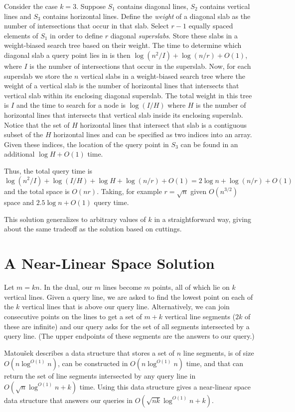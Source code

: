 \documentclass{article}
\newcommand{\polylog}{\log^{O(1)}}
\begin{document}
Consider the case $k=3$.  Suppose $S_1$ contains diagonal lines, $S_2$
contains vertical lines and $S_3$ contains horizontal lines. Define
the \emph{weight} of a diagonal slab as the number of intersections
that occur in that slab.  Select $r-1$ equally spaced elements of
$S_1$ in order to define $r$ diagonal \emph{superslabs}.  Store these
slabs in a weight-biased search tree based on their weight.  The time
to determine which diagonal slab a query point lies in is then $\log
(n^2/I) + \log (n/r) + O(1)$, where $I$ is the number of intersections
that occur in the superslab.  Now, for each superslab we store the $n$
vertical slabs in a weight-biased search tree where the weight of a
vertical slab is the number of horizontal lines that intersects that
vertical slab within its enclosing diagonal superslab.  The total
weight in this tree is $I$ and the time to search for a node is $\log
(I/H)$ where $H$ is the number of horizontal lines that intersects
that vertical slab inside its enclosing superslab. Notice that the set
of $H$ horizontal lines that intersect that slab is a contiguous
subset of the $H$ horizontal lines and can be specified as two indices
into an array.  Given these indices, the location of the query point
in $S_3$ can be found in an additional $\log H + O(1)$ time.

Thus, the total query time is $\log (n^2/I) + \log(I/H) + \log H +
\log (n/r)+O(1)= 2\log n+\log(n/r)+O(1)$ and the total space is
$O(nr)$.  Taking, for example $r=\sqrt{n}$ given $O(n^{3/2})$ space
and $2.5\log n + O(1)$ query time.

This solution generalizes to arbitrary values of $k$ in a
straightforward way, giving about the same tradeoff as the solution
based on cuttings.

\section{A Near-Linear Space Solution}

Let $m=kn$. In the dual, our $m$ lines become $m$ points, all of which
lie on $k$ vertical lines.  Given a query line, we are asked to find
the lowest point on each of the $k$ vertical lines that is above our
query line.  Alternatively, we can join consecutive points on the
lines to get a set of $m+k$ vertical line segments ($2k$ of these are
infinite) and our query asks for the set of all segments intersected
by a query line.  (The upper endpoints of these segments are the
answers to our query.)

Matou\v{s}ek \cite[Lemma~6.3]{m92} describes a data structure that
stores a set of $n$ line segments, is of size $O(n\polylog n)$, can be
constructed in $O(n\polylog n)$ time, and that can return the set of
line segments intersected by any query line in $O(\sqrt{n}\polylog n+
k)$ time.  Using this data structure gives a near-linear space data
structure that answers our queries in $O(\sqrt{nk}\polylog n + k)$.
\end{document}
